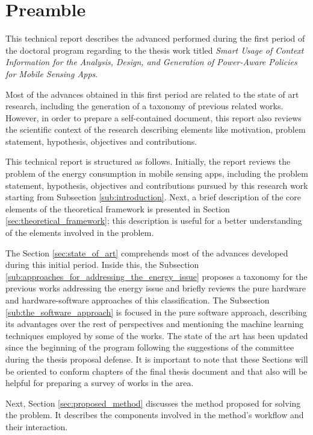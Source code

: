 \section{Preamble}
\label{sec:preamble}
This technical report describes the advanced performed during the first period of the doctoral program regarding to the thesis work titled \emph{Smart Usage of Context Information for the Analysis, Design, and Generation of Power-Aware Policies for Mobile Sensing Apps}.

Most of the advances obtained in this first period are related to the state of art research, including the generation of a taxonomy of previous related works.
However, in order to prepare a self-contained document, this report also reviews the scientific context of the research describing elements like motivation, problem statement, hypothesis, objectives and contributions.

This technical report is structured as follows.
Initially, the report reviews the problem of the energy consumption in mobile sensing apps, including the problem statement, hypothesis, objectives and contributions pursued by this research work starting from Subsection \ref{sub:introduction}.
Next, a brief description of the core elements of the theoretical framework is presented in Section \ref{sec:theoretical_framework}; this description is useful for a better understanding of the elements involved in the problem.

The Section \ref{sec:state_of_art} comprehends most of the advances developed during this initial period. 
Inside this, the Subsection \ref{sub:approaches_for_addressing_the_energy_issue} proposes a taxonomy for the previous works addressing the energy issue and briefly reviews the pure hardware and hardware-software approaches of this classification. 
The Subsection \ref{sub:the_software_approach} is focused in the pure software approach, describing its advantages over the rest of perspectives and mentioning the machine learning techniques employed by some of the works.
The state of the art has been updated since the beginning of the program following the suggestions of the committee during the thesis proposal defense.
It is important to note that these Sections will be oriented to conform chapters of the final thesis document and that also will be helpful for preparing a survey of works in the area.

Next, Section \ref{sec:proposed_method} discusses the method proposed for solving the problem.
It describes the components involved in the method's workflow and their interaction.

